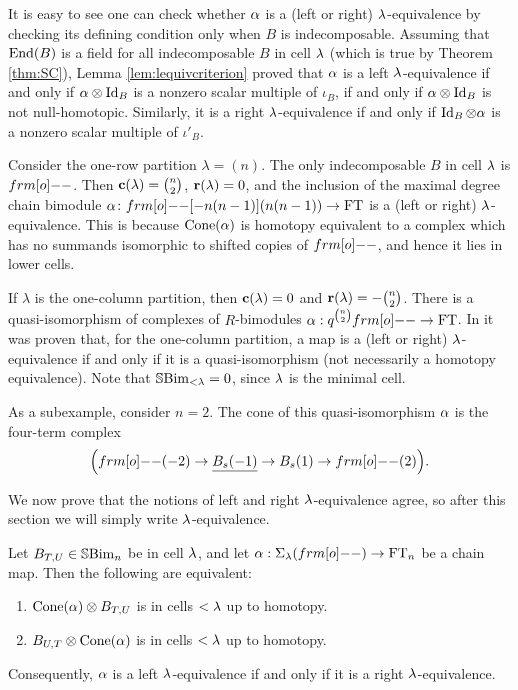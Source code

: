 It is easy to see one can check whether $\alpha$ is a (left or right) $\lambda$-equivalence by checking its defining condition only when $B$ is indecomposable. Assuming that $\operatorname{End}(B)$ is a field for all indecomposable $B$ in cell $\lambda$ (which is true by Theorem \ref{thm:SC}), Lemma \ref{lem:lequivcriterion} proved that $\alpha$ is a left $\lambda$-equivalence if and only if $\alpha \otimes \operatorname{Id}_B$ is a nonzero scalar multiple of $\iota_B$, if and only if $\alpha \otimes \operatorname{Id}_B$ is not null-homotopic. Similarly, it is a right $\lambda$-equivalence if and only if $\operatorname{Id}_B \otimes \alpha$ is a nonzero scalar multiple of $\iota'_B$.

\begin{ex}
Consider the one-row partition $\lambda=(n)$. The only indecomposable $B$ in cell $\lambda$ is $\one$. Then $\mathbf{c}(\lambda)=\binom{n}{2}$, $\mathbf{r}(\lambda)=0$, and the inclusion of the maximal degree chain bimodule $\a \co \one[-n(n-1)](n(n-1)) \rightarrow \FT$ is a (left or right) $\lambda$-equivalence. This is because $\operatorname{Cone}(\alpha)$ is homotopy equivalent to a complex which has no summands isomorphic to shifted copies of $\one$, and hence it lies in lower cells.
\end{ex}

\begin{ex}
If $\lambda$ is the one-column partition, then $\mathbf{c}(\lambda) = 0$ and $\mathbf{r}(\lambda)=-\binom{n}{2}$.  There is a quasi-isomorphism of complexes of $R$-bimodules $\a:q^{\binom{n}{2}}\one \to \FT$.  In \cite{AbHog17} it was proven that, for the one-column partition, a map is a (left or right) $\lambda$-equivalence if and only if it is a quasi-isomorphism (not necessarily a homotopy equivalence).  Note that ${\mathbb{S}}{\rm Bim }_{< \lambda} = 0$, since $\lambda$ is the minimal cell.

As a subexample, consider $n=2$. The cone of this quasi-isomorphism $\alpha$ is the four-term complex
\[
\Big( \one(-2) \to \un{B_s(-1)} \to B_s(1) \to \one(2) \Big).
\]
\end{ex}

We now prove that the notions of left and right $\lambda$-equivalence agree, so after this section we will simply write $\lambda$-equivalence.

\begin{lemma}\label{lemma:lequivsymmetry}
Let $B_{T,U}\in {\mathbb{S}}{\rm Bim }_n$ be in cell $\lambda$, and let $\a:\shift{\l}{\one}\to \FT_n$ be a chain map.  Then the following are equivalent:
\begin{enumerate}\setlength{\itemsep}{3pt}
\item $\operatorname{Cone}(\alpha)\otimes B_{T,U}$ is in cells $<\lambda$ up to homotopy.
\item $B_{U,T}\otimes \operatorname{Cone}(\alpha)$ is in cells $<\lambda$ up to homotopy.
\end{enumerate}
Consequently, $\alpha$ is a left $\lambda$-equivalence if and only if it is a right $\lambda$-equivalence.
\end{lemma}

